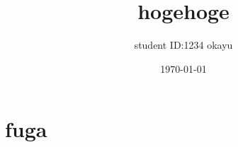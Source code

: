 \documentclass[a4paper, dvipdfmx]{jsarticle}
\title{\Large{hogehoge}}
\author{
	student ID:1234
	okayu
}
\date{\today}
\begin{document}
\maketitle


\section*{fuga}
\end{document}
